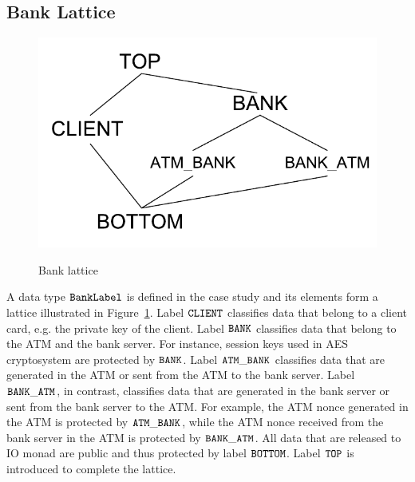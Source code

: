 \documentclass[a4paper]{report}
\newcommand{\co}[1]{$\cod{#1}$}
\begin{document}
\subsection{Bank Lattice}
\begin{figure}[t]


\begin{center}
\includegraphics[scale=0.5]{bank.pdf} \\
\end{center}

\caption{Bank lattice}
\label{fig:banklattice}
\end{figure}
A data type \co{BankLabel} is defined in the case study and its elements form a lattice illustrated 
in Figure~\ref{fig:banklattice}.
Label \co{CLIENT} classifies data that belong to a client card, e.g. the private key of the client.
Label \co{BANK} classifies data that belong to the ATM and the bank server. For instance, session keys used in
AES cryptosystem are
protected by \co{BANK}. Label \co{ATM\_BANK} classifies data that are generated in the ATM or sent from the ATM
to the bank server. Label \co{BANK\_ATM}, in contrast, classifies data that are generated in the bank server or
sent from the bank server to the ATM.
For example, the ATM nonce generated in the ATM is protected by \co{ATM\_BANK},
while the ATM nonce received from the bank server in the ATM is protected by \co{BANK\_ATM}. 
All data that are released to IO monad are public and thus protected by label \co{BOTTOM}.
Label \co{TOP} is introduced to complete the lattice.
\end{document}
